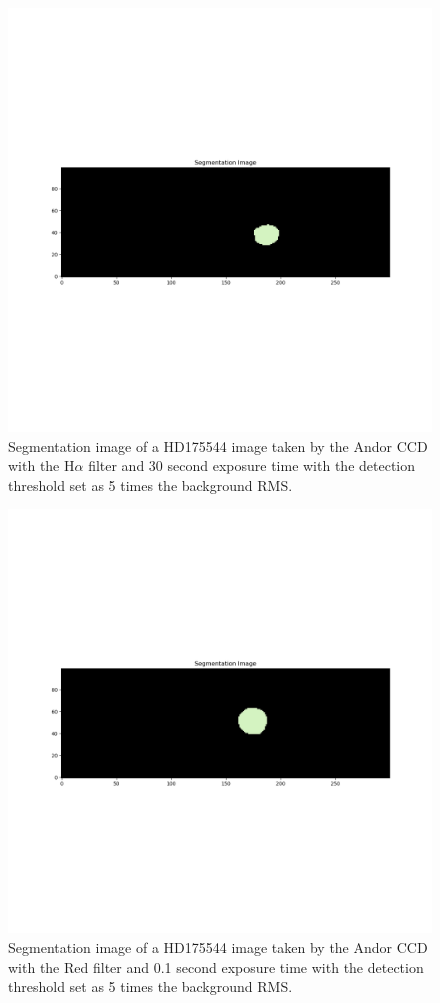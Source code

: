 \documentclass{article}
\begin{document}
\begin{figure}[h!]
    \includegraphics[width=\textwidth]{Figures/HD175544Hasegmented.png}
    \caption{Segmentation image of a HD175544 image taken by the Andor CCD with the H$\alpha$ filter and 30 second exposure time with the detection threshold set as 5 times the background RMS.}
    \label{fig:Hasegment}
\end{figure}

\begin{figure}[h!]
    \includegraphics[width=\textwidth]{Figures/HD175544Redsegmented.png}
    \caption{Segmentation image of a HD175544 image taken by the Andor CCD with the Red filter and 0.1 second exposure time with the detection threshold set as 5 times the background RMS.}
    \label{fig:Redsegment}
\end{figure}
\end{document}
